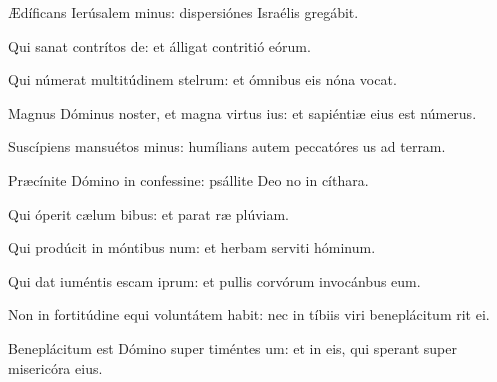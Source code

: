 \item {}

\item Ædíficans Ierúsalem minus:\psstar{} dispersiónes Israélis gregábit.

\item Qui sanat contrítos de:\psstar{} et álligat contritió eórum.

\item Qui númerat multitúdinem stelrum:\psstar{} et ómnibus eis nóna vocat.

\item Magnus Dóminus noster, et magna virtus ius:\psstar{} et sapiéntiæ eius  est númerus.

\item Suscípiens mansuétos minus:\psstar{} humílians autem peccatóres us ad terram.

\item Præcínite Dómino in confessine:\psstar{} psállite Deo no in cíthara.

\item Qui óperit cælum bibus:\psstar{} et parat ræ plúviam.

\item Qui prodúcit in móntibus num:\psstar{} et herbam serviti hóminum.

\item Qui dat iuméntis escam iprum:\psstar{} et pullis corvórum invocánbus eum.

\item Non in fortitúdine equi voluntátem habit:\psstar{} nec in tíbiis viri beneplácitum rit ei.

\item Beneplácitum est Dómino super timéntes um:\psstar{} et in eis, qui sperant super misericóra eius.


